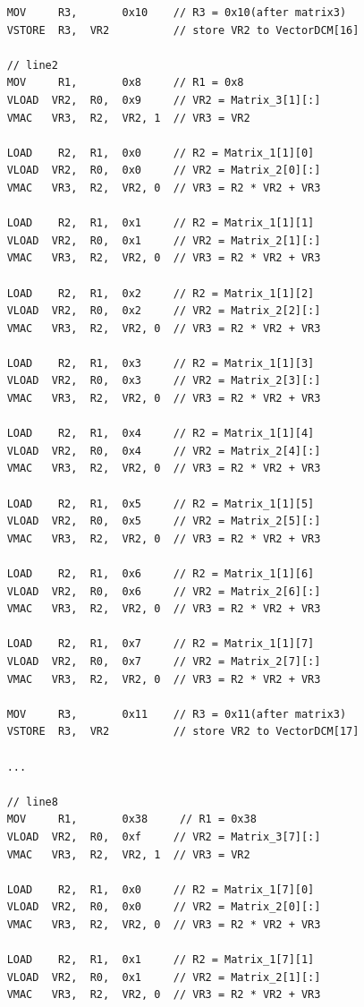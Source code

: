 \documentclass[UTF8]{ctexart}
\begin{document}
\begin{lstlisting}
    MOV     R3,       0x10    // R3 = 0x10(after matrix3)
    VSTORE  R3,  VR2          // store VR2 to VectorDCM[16]

    // line2
    MOV     R1,       0x8     // R1 = 0x8
    VLOAD  VR2,  R0,  0x9     // VR2 = Matrix_3[1][:]
    VMAC   VR3,  R2,  VR2, 1  // VR3 = VR2

    LOAD    R2,  R1,  0x0     // R2 = Matrix_1[1][0]
    VLOAD  VR2,  R0,  0x0     // VR2 = Matrix_2[0][:]
    VMAC   VR3,  R2,  VR2, 0  // VR3 = R2 * VR2 + VR3

    LOAD    R2,  R1,  0x1     // R2 = Matrix_1[1][1]
    VLOAD  VR2,  R0,  0x1     // VR2 = Matrix_2[1][:]
    VMAC   VR3,  R2,  VR2, 0  // VR3 = R2 * VR2 + VR3

    LOAD    R2,  R1,  0x2     // R2 = Matrix_1[1][2]
    VLOAD  VR2,  R0,  0x2     // VR2 = Matrix_2[2][:]
    VMAC   VR3,  R2,  VR2, 0  // VR3 = R2 * VR2 + VR3

    LOAD    R2,  R1,  0x3     // R2 = Matrix_1[1][3]
    VLOAD  VR2,  R0,  0x3     // VR2 = Matrix_2[3][:]
    VMAC   VR3,  R2,  VR2, 0  // VR3 = R2 * VR2 + VR3

    LOAD    R2,  R1,  0x4     // R2 = Matrix_1[1][4]
    VLOAD  VR2,  R0,  0x4     // VR2 = Matrix_2[4][:]
    VMAC   VR3,  R2,  VR2, 0  // VR3 = R2 * VR2 + VR3

    LOAD    R2,  R1,  0x5     // R2 = Matrix_1[1][5]
    VLOAD  VR2,  R0,  0x5     // VR2 = Matrix_2[5][:]
    VMAC   VR3,  R2,  VR2, 0  // VR3 = R2 * VR2 + VR3

    LOAD    R2,  R1,  0x6     // R2 = Matrix_1[1][6]
    VLOAD  VR2,  R0,  0x6     // VR2 = Matrix_2[6][:]
    VMAC   VR3,  R2,  VR2, 0  // VR3 = R2 * VR2 + VR3

    LOAD    R2,  R1,  0x7     // R2 = Matrix_1[1][7]
    VLOAD  VR2,  R0,  0x7     // VR2 = Matrix_2[7][:]
    VMAC   VR3,  R2,  VR2, 0  // VR3 = R2 * VR2 + VR3

    MOV     R3,       0x11    // R3 = 0x11(after matrix3)
    VSTORE  R3,  VR2          // store VR2 to VectorDCM[17]

    ...

    // line8
    MOV     R1,       0x38     // R1 = 0x38
    VLOAD  VR2,  R0,  0xf     // VR2 = Matrix_3[7][:]
    VMAC   VR3,  R2,  VR2, 1  // VR3 = VR2

    LOAD    R2,  R1,  0x0     // R2 = Matrix_1[7][0]
    VLOAD  VR2,  R0,  0x0     // VR2 = Matrix_2[0][:]
    VMAC   VR3,  R2,  VR2, 0  // VR3 = R2 * VR2 + VR3

    LOAD    R2,  R1,  0x1     // R2 = Matrix_1[7][1]
    VLOAD  VR2,  R0,  0x1     // VR2 = Matrix_2[1][:]
    VMAC   VR3,  R2,  VR2, 0  // VR3 = R2 * VR2 + VR3


\end{lstlisting}
\end{document}
